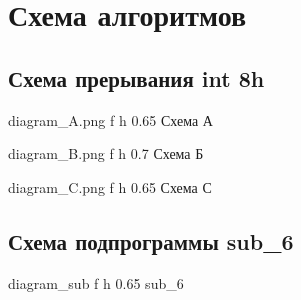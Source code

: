 \documentclass[a4paper,12pt]{bmstu}
\begin{document}
\chapter{Схема алгоритмов}\label{ch:alg}
\section{Схема прерывания int 8h}\label{sec:int}
{diagram_A.png} %
{f} %
{h} %
{0.65\textwidth} %
{Схема А} %
\clearpage

{diagram_B.png} %
{f} %
{h} %
{0.7\textwidth} %
{Схема Б} %
\clearpage

{diagram_C.png} %
{f} %
{h} %
{0.65\textwidth} %
{Схема С} %
\clearpage

\section{Схема подпрограммы sub\_6}\label{sec:sub}
{diagram_sub} %
{f} %
{h} %
{0.65\textwidth} %
{sub\_6} %
\end{document}

